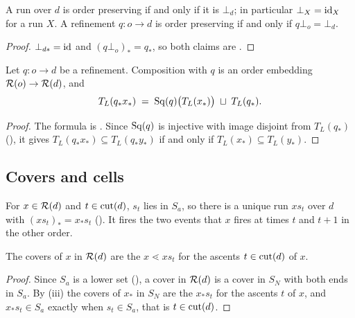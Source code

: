 \documentclass[11pt]{article}
\begin{document}
\begin{lemma}\label{lem:bot}
  A run over $d$ is order preserving if and only if it is $\bot_d$; in particular $\bot_X = \operatorname{id}_X$
  for a run $X$. A refinement $q : o \to d$ is order preserving if and only if $q\bot_o = \bot_d$.
\end{lemma}
\begin{proof}
  $\bot_{d*} = \operatorname{id}$ and $(q\bot_o)_* = q_*$, so both claims are .
\end{proof}

\begin{proposition}\label{prop:push}
  Let $q : o \to d$ be a refinement. Composition with $q$ is an order embedding
  $\mathcal{R}(o) \to \mathcal{R}(d)$, and
  \[
    T_L(q_*x_*) \;=\; \operatorname{Sq}(q)\bigl(T_L(x_*)\bigr) \;\sqcup\; T_L(q_*) .
  \]
\end{proposition}
\begin{proof}
  The formula is . Since $\operatorname{Sq}(q)$ is injective with image disjoint from $T_L(q_*)$
  (), it gives $T_L(q_*x_*) \subseteq T_L(q_*y_*)$ if and only if
  $T_L(x_*) \subseteq T_L(y_*)$.
\end{proof}

\subsection{Covers and cells}

For $x \in \mathcal{R}(d)$ and $t \in \operatorname{cut}(d)$, $s_t$ lies in $S_a$, so there is a unique run
$xs_t$ over $d$ with $(xs_t)_* = x_*s_t$ (). It fires the two events that
$x$ fires at times $t$ and $t+1$ in the other order.

\begin{lemma}\label{lem:cover}
  The covers of $x$ in $\mathcal{R}(d)$ are the $x \lessdot xs_t$ for the ascents $t \in \operatorname{cut}(d)$ of
  $x$.
\end{lemma}
\begin{proof}
  Since $S_a$ is a lower set (), a cover in $\mathcal{R}(d)$ is a cover in $S_N$ with
  both ends in $S_a$. By (iii) the covers of $x_*$ in $S_N$ are the $x_*s_t$ for the
  ascents $t$ of $x$, and $x_*s_t \in S_a$ exactly when $s_t \in S_a$, that is $t \in \operatorname{cut}(d)$.
\end{proof}
\end{document}
